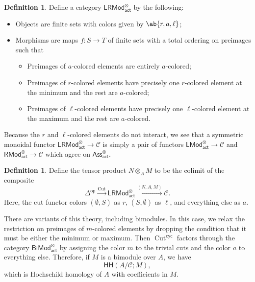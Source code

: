 \documentclass[10pt, oneside]{memoir}
\theoremstyle{definition}
\newtheorem{defn}[thm]{Definition}
\theoremstyle{remark}
\theoremstyle{plain}
\theoremstyle{definition}
\theoremstyle{remark}
\newcommand{\mc}[1]{\mathcal{#1}}
\newcommand{\on}[1]{\operatorname{#1}}
\newcommand{\ms}[1]{\mathsf{#1}}
\newcommand{\1}{\mathbf{1}}
\newcommand{\2}{\mathbf{2}}
\newcommand{\3}{\mathbf{3}}
\newcommand{\HH}{\ms{HH}}
\DeclareMathOperator{\op}{op}
\begin{document}
\begin{defn}
    Define a category \(\ms{LRMod}_{\ms{act}}^{\otimes} \) by the following:
    \begin{itemize}
        \item Objects are finite sets with colors given by \(\ab\{r, a, \ell \} \);
        \item Morphisms are maps \(f \colon S \to T \) of finite sets with a total ordering on preimages such that
        \begin{itemize}
            \item Preimages of \(a \)-colored elements are entirely \(a \)-colored;
            \item Preimages of \(r \)-colored elements have precisely one \(r \)-colored element at the minimum and the rest are \(a \)-colored;
            \item Preimages of \(\ell \)-colored elements have precisely one \(\ell \)-colored element at the maximum and the rest are \(a \)-colored.
        \end{itemize}
    \end{itemize}
\end{defn}

Because the \(r \) and \(\ell \)-colored elements do not interact, we see that a symmetric monoidal functor \(\ms{LRMod}_{\ms{act}}^{\otimes} \to \mc{C} \) is simply a pair of functors \(\ms{LMod}_{\ms{act}}^{\otimes}\to \mc{C} \) and \(\ms{RMod}_{\ms{act}}^{\otimes} \to \mc{C} \) which agree on \(\ms{Ass}_{\ms{act}}^{\otimes} \).

\begin{defn}
    Define the tensor product \(N \otimes_A M \) to be the colimit of the composite
    \[ \Delta^{\op} \xrightarrow{\on{Cut}} \ms{LRMod}_{\ms{act}}^{\otimes} \xrightarrow{(N, A, M)} \mc{C}. \]
    Here, the cut functor colors \((\emptyset, S) \) as \(r \), \((S, \emptyset) \) as \(\ell \), and everything else as \(a \).
\end{defn}

There are variants of this theory, including bimodules. In this case, we relax the restriction on preimages of \(m \)-colored elements by dropping the condition that it must be either the minimum or maximum. Then \(\on{Cut}^{\ms{cyc}} \) factors through the category \(\ms{BiMod}_{\ms{act}}^{\otimes} \) by assigning the color \(m \) to the trivial cuts and the color \(a \) to everything else. Therefore, if \(M \) is a bimodule over \(A \), we have
\[ \HH(A/\mc{C}; M), \]
which is Hochschild homology of \(A \) with coefficients in \(M \).
\end{document}
